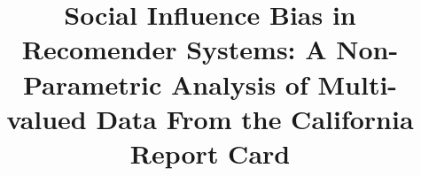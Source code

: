 \documentclass{sig-alternate}
\begin{document}
\title{Social Influence Bias in Recomender Systems: A Non-Parametric Analysis of Multi-valued Data From the California Report Card}

\linespread{0.95}%
\setlength{\belowdisplayskip}{2pt} \setlength{\belowdisplayshortskip}{2pt}
\setlength{\abovedisplayskip}{2pt} \setlength{\abovedisplayshortskip}{2pt}
\selectfont

%
%
%
%
%


%

\end{document}
